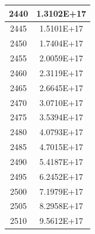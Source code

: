 \documentclass[a4paper]{article}
\begin{document}
\begin{tabular}{| c | c |}
    	2440 & 1.3102E+17 \\\hline
    	2445 & 1.5101E+17 \\\hline
    	2450 & 1.7404E+17 \\\hline
    	2455 & 2.0059E+17 \\\hline
    	2460 & 2.3119E+17 \\\hline
    	2465 & 2.6645E+17 \\\hline
    	2470 & 3.0710E+17 \\\hline
    	2475 & 3.5394E+17 \\\hline
    	2480 & 4.0793E+17 \\\hline
    	2485 & 4.7015E+17 \\\hline
    	2490 & 5.4187E+17 \\\hline
    	2495 & 6.2452E+17 \\\hline
    	2500 & 7.1979E+17 \\\hline
    	2505 & 8.2958E+17 \\\hline
    	2510 & 9.5612E+17 \\\hline
    \end{tabular}
    \hfill
\end{document}
